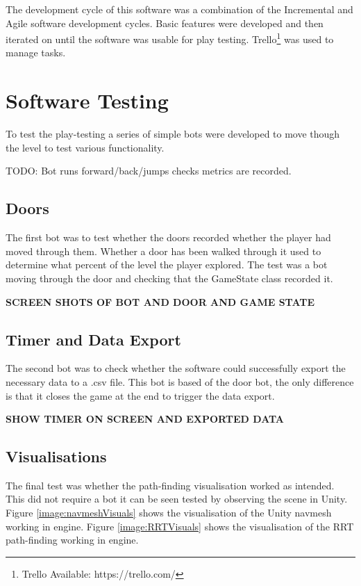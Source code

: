 \documentclass[journal]{IEEEtran}
\begin{document}
The development cycle of this software was a combination of the Incremental and Agile software development cycles. Basic features were developed and then iterated on until the software was usable for play testing. Trello\footnote[5]{Trello Available: https://trello.com/} was used to manage tasks.

\section{Software Testing} \label{softtest}
To test the play-testing a series of simple bots were developed to move though the level to test various functionality.

TODO: Bot runs forward/back/jumps checks metrics are recorded. \\ 
\subsection{Doors}
The first bot was to test whether the doors recorded whether the player had moved through them. Whether a door has been walked through it used to determine what percent of the level the player explored.
The test was a bot moving through the door and checking that the GameState class recorded it.

\textbf{SCREEN SHOTS OF BOT AND DOOR AND GAME STATE}

\subsection{Timer and Data Export}
The second bot was to check whether the software could successfully export the necessary data to a .csv file. This bot is based of the door bot, the only difference is that it closes the game at the end to trigger the data export.  

\textbf{SHOW TIMER ON SCREEN AND EXPORTED DATA}

\subsection{Visualisations}
The final test was whether the path-finding visualisation worked as intended. This did not require a bot it can be seen tested by observing the scene in Unity. Figure \ref{image:navmeshVisuals} shows the visualisation of the Unity navmesh working in engine.  Figure \ref{image:RRTVisuals} shows the visualisation of the RRT path-finding working in engine.
\end{document}
